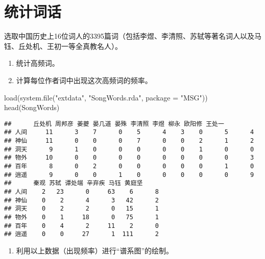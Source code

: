 \documentclass[
  lang=cn,
  11pt,
  scheme=chinese,
  chinesefont=nofont,
  citestyle=gb7714-2015,
  bibstyle=gb7714-2015]{elegantbook}
\newenvironment{Shaded}{\begin{snugshade}}{\end{snugshade}}
\newcommand{\AttributeTok}[1]{\textcolor[rgb]{0.77,0.63,0.00}{#1}}
\newcommand{\FunctionTok}[1]{\textcolor[rgb]{0.00,0.00,0.00}{#1}}
\newcommand{\NormalTok}[1]{#1}
\newcommand{\StringTok}[1]{\textcolor[rgb]{0.31,0.60,0.02}{#1}}
\providecommand{\tightlist}{%
  \setlength{\itemsep}{0pt}\setlength{\parskip}{0pt}}
\begin{document}
\hypertarget{ux7edfux8ba1ux8bcdux8bdd}{%
\section{统计词话}\label{ux7edfux8ba1ux8bcdux8bdd}}

选取中国历史上16位词人的3395篇词（包括李煜、李清照、苏轼等著名词人以及马钰、丘处机、王初一等全真教名人）。

\begin{enumerate}
\def\labelenumi{\arabic{enumi}.}
\item
  统计高频词。
\item
  计算每位作者词中出现这次高频词的频率。
\end{enumerate}

\begin{Shaded}
\begin{Highlighting}[]
\FunctionTok{load}\NormalTok{(}\FunctionTok{system.file}\NormalTok{(}\StringTok{"extdata"}\NormalTok{, }\StringTok{"SongWords.rda"}\NormalTok{, }\AttributeTok{package =} \StringTok{"MSG"}\NormalTok{))}
\FunctionTok{head}\NormalTok{(SongWords)}
\end{Highlighting}
\end{Shaded}

\begin{verbatim}
##      丘处机 周邦彦 姜夔 晏几道 晏殊 李清照 李煜 柳永 欧阳修 王处一
## 人间     11      3    7      0    5      4    3    0      5      4
## 神仙     11      0    0      0    7      0    0    2      1      2
## 洞天      9      1    0      0    0      0    0    1      0      0
## 物外     10      0    0      0    0      0    0    0      0      3
## 百年      8      0    2      0    0      0    0    0      1      0
## 逍遥      9      0    0      1    0      0    0    0      0      9
##      秦观 苏轼 谭处端 辛弃疾 马钰 黄庭坚
## 人间    2   23      0     63    6      8
## 神仙    0    2      4      3   42      2
## 洞天    0    2      2      0   15      1
## 物外    0    1     18      0   75      1
## 百年    0    4      2     11    2      0
## 逍遥    0    0     27      1  111      2
\end{verbatim}

\begin{enumerate}
\def\labelenumi{\arabic{enumi}.}
\setcounter{enumi}{2}
\tightlist
\item
  利用以上数据（出现频率）进行``谱系图''的绘制。
\end{enumerate}
\end{document}
